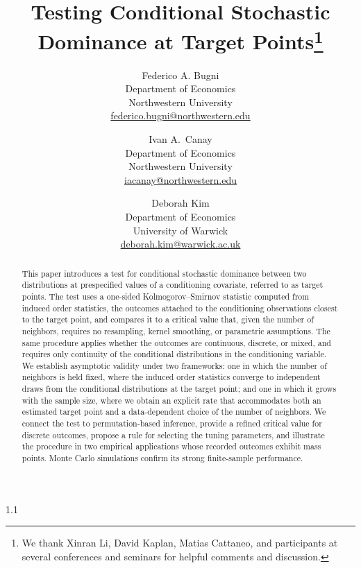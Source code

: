 \documentclass[11pt]{article}
\numberwithin{equation}{section}
\begin{document}
\author{
Federico A. Bugni \\
Department of Economics\\
Northwestern University \\
\url{federico.bugni@northwestern.edu}
\and
Ivan A.\ Canay \\
Department of Economics\\
Northwestern University\\
\url{iacanay@northwestern.edu}
\and
Deborah Kim \\
Department of Economics\\
University of Warwick\\
\url{deborah.kim@warwick.ac.uk}
}

\title{Testing Conditional Stochastic Dominance at Target Points\footnote{We thank Xinran Li, David Kaplan, Matias Cattaneo, and participants at several conferences and seminars for helpful comments and discussion.}}

\maketitle


\begin{spacing}{1.1}
  \begin{abstract}
    This paper introduces a test for conditional stochastic dominance between two distributions at prespecified values of a conditioning covariate, referred to as target points. The test uses a one-sided Kolmogorov--Smirnov statistic computed from induced order statistics, the outcomes attached to the conditioning observations closest to the target point, and compares it to a critical value that, given the number of neighbors, requires no resampling, kernel smoothing, or parametric assumptions. The same procedure applies whether the outcomes are continuous, discrete, or mixed, and requires only continuity of the conditional distributions in the conditioning variable. We establish asymptotic validity under two frameworks: one in which the number of neighbors is held fixed, where the induced order statistics converge to independent draws from the conditional distributions at the target point; and one in which it grows with the sample size, where we obtain an explicit rate that accommodates both an estimated target point and a data-dependent choice of the number of neighbors. We connect the test to permutation-based inference, provide a refined critical value for discrete outcomes, propose a rule for selecting the tuning parameters, and illustrate the procedure in two empirical applications whose recorded outcomes exhibit mass points. Monte Carlo simulations confirm its strong finite-sample performance.
    \end{abstract}
\end{spacing}
\end{document}
